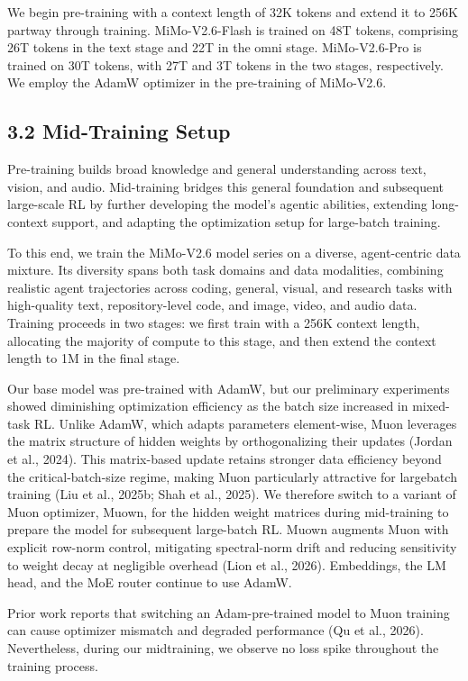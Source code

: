 \documentclass[
  10
]{article}
\begin{document}
We begin pre-training with a context length of 32K tokens and extend it
to 256K partway through training. MiMo-V2.6-Flash is trained on 48T
tokens, comprising 26T tokens in the text stage and 22T in the omni
stage. MiMo-V2.6-Pro is trained on 30T tokens, with 27T and 3T tokens in
the two stages, respectively. We employ the AdamW optimizer in the
pre-training of MiMo-V2.6.

\subsection{3.2 Mid-Training Setup}\label{mid-training-setup}

Pre-training builds broad knowledge and general understanding across
text, vision, and audio. Mid-training bridges this general foundation
and subsequent large-scale RL by further developing the model's agentic
abilities, extending long-context support, and adapting the optimization
setup for large-batch training.

To this end, we train the MiMo-V2.6 model series on a diverse,
agent-centric data mixture. Its diversity spans both task domains and
data modalities, combining realistic agent trajectories across coding,
general, visual, and research tasks with high-quality text,
repository-level code, and image, video, and audio data. Training
proceeds in two stages: we first train with a 256K context length,
allocating the majority of compute to this stage, and then extend the
context length to 1M in the final stage.

Our base model was pre-trained with AdamW, but our preliminary
experiments showed diminishing optimization efficiency as the batch size
increased in mixed-task RL. Unlike AdamW, which adapts parameters
element-wise, Muon leverages the matrix structure of hidden weights by
orthogonalizing their updates (Jordan et al., 2024). This matrix-based
update retains stronger data efficiency beyond the critical-batch-size
regime, making Muon particularly attractive for largebatch training (Liu
et al., 2025b; Shah et al., 2025). We therefore switch to a variant of
Muon optimizer, Muown, for the hidden weight matrices during
mid-training to prepare the model for subsequent large-batch RL. Muown
augments Muon with explicit row-norm control, mitigating spectral-norm
drift and reducing sensitivity to weight decay at negligible overhead
(Lion et al., 2026). Embeddings, the LM head, and the MoE router
continue to use AdamW.

Prior work reports that switching an Adam-pre-trained model to Muon
training can cause optimizer mismatch and degraded performance (Qu et
al., 2026). Nevertheless, during our midtraining, we observe no loss
spike throughout the training process.
\end{document}
